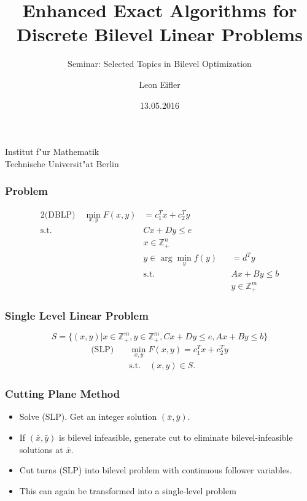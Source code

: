 \documentclass[11pt]{beamer}
\begin{document}
	\title %
	{Enhanced Exact Algorithms for Discrete Bilevel Linear Problems	}
	\subtitle{Seminar: Selected Topics in Bilevel Optimization}
	
	\author %
	{Leon Eifler}
	
	\institute %
	{
	
		Institut f"ur Mathematik\\
		Technische Universit"at Berlin
		
	}
	
	\date %
	{13.05.2016}
	

	\begin{frame}[plain]
	\titlepage

	\end{frame}

\begin{frame}	
	\frametitle{Problem}
	\begin{alignat*}{2}
		\text{(DBLP)} \quad \min_{x,y} F(x,y) &= c_1^Tx +c_2^Ty \\
		\text{s.t.} \quad &Cx + Dy \le e \\
		&x \in \mathbb{Z}^n_+ \\
		&y \in \arg \min_y f(y) &&= d^T y \\
		&\text{s.t.} &&Ax+By \le b \\
		& &&y \in \mathbb{Z}^m_+
	\end{alignat*}
\end{frame}

\begin{frame}
	\frametitle{Single Level Linear Problem}
	\begin{equation*}
		S = \{(x,y) | x \in \mathbb{Z}^m_+, y \in \mathbb{Z}^m_+, Cx+Dy \le e, Ax + By \le b \}
	\end{equation*}
	\begin{align*}
		\text{(SLP)} \quad &\min_{x,y} F(x,y) = c_1^Tx +c_2^Ty \\
		&\text{s.t.} \quad (x,y) \in S.
	\end{align*}
\end{frame}

\begin{frame}
	\frametitle{Cutting Plane Method}
	\begin{itemize}
		\item Solve (SLP). Get an integer solution $(\bar x, \bar y)$.
		\item If $(\bar x, \bar y)$ is bilevel infeasible, generate cut to eliminate bilevel-infeasible solutions at $\bar x$.
		\item Cut turns (SLP) into bilevel problem with continuous follower variables. 
		\item This can again be transformed into a single-level problem
	\end{itemize}
\end{frame}
\end{document}
